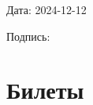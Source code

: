 \documentclass[a4paper,12pt]{article}
\begin{document}
Дата: 2024-12-12

Подпись: \underline{\hspace{3cm}}

\section*{Билеты}
\end{document}
